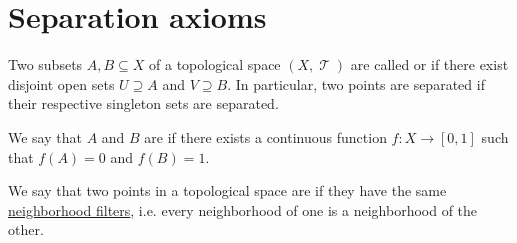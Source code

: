 \section{Separation axioms}\label{sec:separation_axioms}

\begin{definition}\label{def:topological_space_separation}
  Two subsets \( A, B \subseteq X \) of a topological space \( (X, \mscrT) \) are called  or  if there exist disjoint open sets \( U \supseteq A \) and \( V \supseteq B \). In particular, two points are separated if their respective singleton sets are separated.

  We say that \( A \) and \( B \) are  if there exists a continuous function \( f: X \to [0, 1] \) such that \( f(A) = 0 \) and \( f(B) = 1 \).
\end{definition}

\begin{definition}\label{def:topologically_indistinguishable}\mimprovised
  We say that two points in a topological space are  if they have the same \hyperref[def:neighborhood_filter]{neighborhood filters}, i.e. every neighborhood of one is a neighborhood of the other.
\end{definition}


